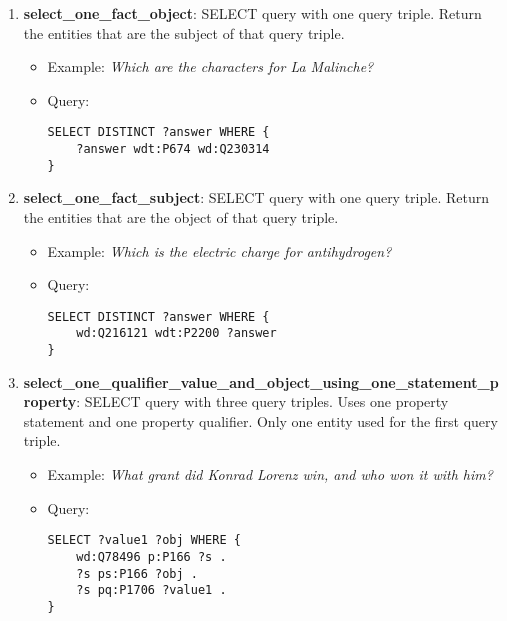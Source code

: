 \begin{enumerate}
    \item \textbf{select\_one\_fact\_object}: SELECT query with one query triple. Return the entities 
    that are the subject of that query triple.
    \begin{itemize}
        \item Example: \textit{Which are the characters for La Malinche?}
        \item Query:
        \begin{lstlisting}[basicstyle=\ttfamily,frame=single]        
SELECT DISTINCT ?answer WHERE { 
    ?answer wdt:P674 wd:Q230314
}
        \end{lstlisting}
    \end{itemize}
    
    \item \textbf{select\_one\_fact\_subject}: SELECT query with one query triple. Return the entities 
    that are the object of that query triple.
    \begin{itemize}
        \item Example: \textit{Which is the electric charge for antihydrogen?}
        \item Query:
        \begin{lstlisting}[basicstyle=\ttfamily,frame=single]        
SELECT DISTINCT ?answer WHERE { 
    wd:Q216121 wdt:P2200 ?answer
}
        \end{lstlisting}
    \end{itemize}
    
    \item \textbf{select\_one\_qualifier\_value\_and\_object\_using\_one\_statement\_property}: SELECT query 
    with three query triples. Uses one property statement and one property qualifier. Only one entity 
    used for the first query triple.
    \begin{itemize}
        \item Example: \textit{What grant did Konrad Lorenz win, and who won it with him?}
        \item Query:
        \begin{lstlisting}[basicstyle=\ttfamily,frame=single]        
SELECT ?value1 ?obj WHERE { 
    wd:Q78496 p:P166 ?s . 
    ?s ps:P166 ?obj . 
    ?s pq:P1706 ?value1 . 
}
        \end{lstlisting}
    \end{itemize}
    

\end{enumerate}
